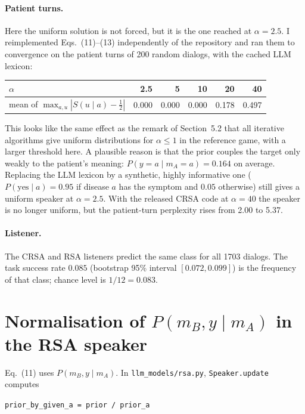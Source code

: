 \documentclass[11pt,a4paper]{article}
\newcommand{\code}[1]{\texttt{\small #1}}
\begin{document}
\paragraph{Patient turns.} Here the uniform solution is not forced, but it is the one reached at
$\alpha = 2.5$. I reimplemented Eqs.~(11)--(13) independently of the repository and ran them to
convergence on the patient turns of 200 random dialogs, with the cached LLM lexicon:

\begin{center}
\begin{tabular}{lrrrrr}
\toprule
$\alpha$ & 2.5 & 5 & 10 & 20 & 40 \\
\midrule
mean of $\max_{a,u} |S(u \mid a) - \tfrac12|$ & 0.000 & 0.000 & 0.000 & 0.178 & 0.497 \\
\bottomrule
\end{tabular}
\end{center}

This looks like the same effect as the remark of Section~5.2 that all iterative algorithms give
uniform distributions for $\alpha \le 1$ in the reference game, with a larger threshold here. A
plausible reason is that the prior couples the target only weakly to the patient's meaning:
$P(y = a \mid m_A = a) = 0.164$ on average. Replacing the LLM lexicon by a synthetic, highly
informative one ($P(\text{yes} \mid a) = 0.95$ if disease $a$ has the symptom and $0.05$ otherwise)
still gives a uniform speaker at $\alpha = 2.5$. With the released CRSA code at $\alpha = 40$ the
speaker is no longer uniform, but the patient-turn perplexity rises from 2.00 to 5.37.

\paragraph{Listener.} The CRSA and RSA listeners predict the same class for all 1703 dialogs. The
task success rate $0.085$ (bootstrap 95\% interval $[0.072, 0.099]$) is the frequency of that
class; chance level is $1/12 = 0.083$.

\section{Normalisation of \texorpdfstring{$P(m_B, y \mid m_A)$}{P(mB, y | mA)} in the RSA speaker}
\label{sec:rsa}

Eq.~(11) uses $P(m_B, y \mid m_A)$. In \code{llm\_models/rsa.py}, \code{Speaker.update} computes

\begin{center}
\code{prior\_by\_given\_a = prior / prior\_a}
\end{center}
\end{document}
